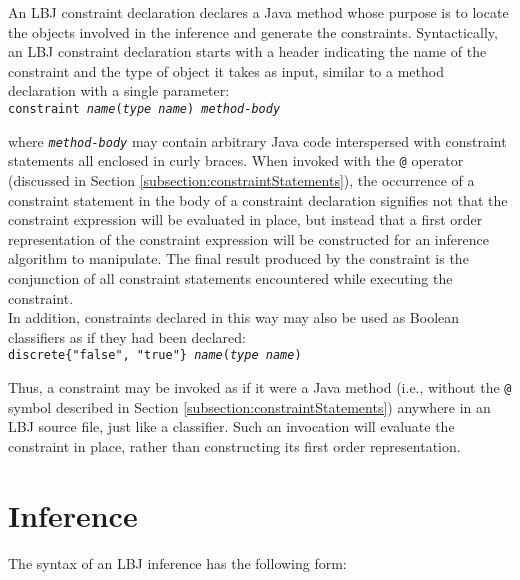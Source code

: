 An LBJ constraint declaration declares a Java method whose purpose is to
locate the objects involved in the inference and generate the constraints.
Syntactically, an LBJ constraint declaration starts with a header indicating
the name of the constraint and the type of object it takes as input, similar
to a method declaration with a single parameter: \\

\vspace{-.25cm}
{\tt constraint \emph{name}(\emph{type name}) \emph{method-body}} \\
\vspace{-.25cm}

\noindent
where {\tt\emph{method-body}} may contain arbitrary Java code interspersed
with constraint statements all enclosed in curly braces.  When invoked with
the {\tt @} operator (discussed in Section
\ref{subsection:constraintStatements}), the occurrence of a constraint
statement in the body of a constraint declaration signifies not that the
constraint expression will be evaluated in place, but instead that a first
order representation of the constraint expression will be constructed for an
inference algorithm to manipulate.  The final result produced by the
constraint is the conjunction of all constraint statements encountered while
executing the constraint. \\

In addition, constraints declared in this way may also be used as Boolean
classifiers as if they had been declared: \\

\vspace{-.25cm}
{\tt discrete\{"false", "true"\} \emph{name}(\emph{type name})} \\
\vspace{-.25cm}

\noindent
Thus, a constraint may be invoked as if it were a Java method (i.e., without
the {\tt @} symbol described in Section \ref{subsection:constraintStatements})
anywhere in an LBJ source file, just like a classifier.  Such an invocation
will evaluate the constraint in place, rather than constructing its first
order representation.

\section{Inference} \label{section:inference}

The syntax of an LBJ inference has the following form: \\

